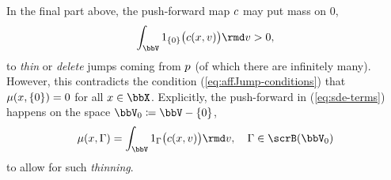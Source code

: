 \begin{remark}
  \label{eq:poisson-remark}
  In the final part above, the push-forward map $c$ may put mass on $0$, 
  \begin{equation*}
    \int_\vecSpace 1_{\{0\}}\big(\thinner(\stateVar, \markVar)\big) \rmd\markVar > 0,
  \end{equation*}
  to \emph{thin} or \emph{delete} jumps coming from $p$ (of which there are infinitely many).
  However, this contradicts the condition (\ref{eq:affJump-conditions}) that $\mu(x, \{0\}) = 0$ for all $\stateVar \in \stateSpace$.
  Explicitly, the push-forward in (\ref{eq:sde-terms}) happens on the space $\markSpace \defeq \vecSpace - \{0\}$,
  \begin{equation*}
    \affJump(\stateVar, \Gamma) = \int_\vecSpace 1_\Gamma\big(\thinner(\stateVar,\markVar)\big)\rmd\markVar, \quad \Gamma \in \scrB(\markSpace)
  \end{equation*}
  to allow for such \emph{thinning}.
\end{remark}
